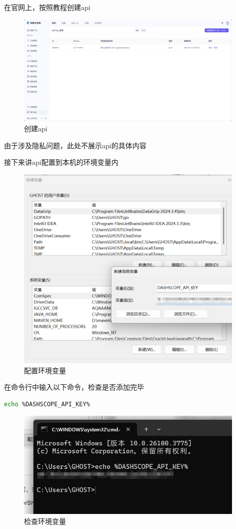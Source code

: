 \documentclass{article}
\begin{document}
	在官网上，按照教程创建api
	
	\begin{figure}[H]
		\centering
		\includegraphics[width=11cm]{./images/13.创建api.png}
		\caption{创建api}
	\end{figure}
	
	由于涉及隐私问题，此处不展示api的具体内容
	
	接下来讲api配置到本机的环境变量内
	
	\begin{figure}[H]
		\centering
		\includegraphics[width=11cm]{./images/14.配置环境变量.png}
		\caption{配置环境变量}
	\end{figure}
	
	在命令行中输入以下命令，检查是否添加完毕
	
	\begin{lstlisting}[language=bash, title=uv安装, tabsize=4]
		echo %DASHSCOPE_API_KEY%
	\end{lstlisting}
	
	\begin{figure}[H]
		\centering
		\includegraphics[width=11cm]{./images/15.检查环境变量.png}
		\caption{检查环境变量}
	\end{figure}
	
\end{document}
